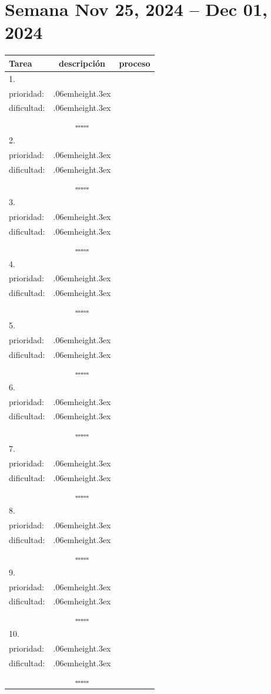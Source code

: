 \documentclass[a4paper,12pt, tikz]{scrartcl}
\newcommand\Vtextvisiblespace[1][.3em]{%
  \mbox{\kern.06em\vrule height.3ex}%
  \vbox{\hrule width#1}%
  \hbox{\vrule height.3ex}}
\newcommand{\subtablaDescrip}{ \begin{tabular}{ll}&\\ prioridad: & \Vtextvisiblespace[2em] \\ dificultad: & \Vtextvisiblespace[2em]\\&\\ \end{tabular}}
\begin{document}
\section*{Semana Nov 25, 2024 -- Dec 01, 2024}
\thispagestyle{empty}
\noindent
\begin{tabularx}{\linewidth}{|X|c c|}
    \hline
  \textbf{Tarea} & \textbf{descripción} & \textbf{proceso}\\
  \hline
   1.\vspace{4ex} &      \subtablaDescrip     & $\square\square\square\square\square$ \\
  \hline
  2.\vspace{4ex} &      \subtablaDescrip     & $\square\square\square\square\square$ \\
  \hline
  3.\vspace{4ex} &      \subtablaDescrip     & $\square\square\square\square\square$ \\
  \hline
  4.\vspace{4ex} &      \subtablaDescrip     & $\square\square\square\square\square$ \\
  \hline
  5.\vspace{4ex} &      \subtablaDescrip     & $\square\square\square\square\square$ \\
  \hline
  6.\vspace{4ex} &      \subtablaDescrip     & $\square\square\square\square\square$ \\
  \hline
  7.\vspace{4ex} &      \subtablaDescrip     & $\square\square\square\square\square$ \\
  \hline
  8.\vspace{4ex} &      \subtablaDescrip     & $\square\square\square\square\square$ \\
  \hline
  9.\vspace{4ex} &      \subtablaDescrip     & $\square\square\square\square\square$ \\
  \hline
  10.\vspace{4ex} &      \subtablaDescrip     & $\square\square\square\square\square$ \\
  \hline
\end{tabularx}

\newpage
\end{document}
